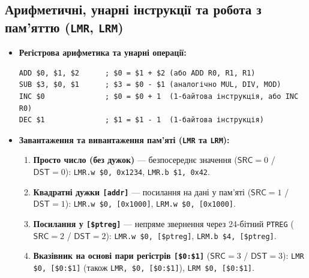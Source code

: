 \documentclass[11pt,a4paper]{article}
\newcommand{\reg}[1]{\texttt{#1}}
\newcommand{\field}[1]{\textsf{#1}}
\begin{document}
\subsection{Арифметичні, унарні інструкції та робота з пам'яттю (\texttt{LMR}, \texttt{LRM})}
\begin{itemize}
  \item \textbf{Регістрова арифметика та унарні операції:}
\begin{verbatim}
ADD $0, $1, $2      ; $0 = $1 + $2 (або ADD R0, R1, R1)
SUB $3, $0, $1      ; $3 = $0 - $1 (аналогічно MUL, DIV, MOD)
INC $0              ; $0 = $0 + 1  (1-байтова інструкція, або INC R0)
DEC $1              ; $1 = $1 - 1  (1-байтова інструкція)
\end{verbatim}
  \item \textbf{Завантаження та вивантаження пам'яті (\texttt{LMR} та \texttt{LRM}):}
    \begin{enumerate}
      \item \textbf{Просто число (без дужок)} --- безпосереднє значення ($\field{SRC}=0$ / $\field{DST}=0$): \texttt{LMR.w \$0, 0x1234}, \texttt{LMR.b \$1, 0x42}.
      \item \textbf{Квадратні дужки \texttt{[addr]}} --- посилання на дані у пам'яті ($\field{SRC}=1$ / $\field{DST}=1$): \texttt{LMR.w \$0, [0x1000]}, \texttt{LRM.w \$0, [0x1000]}.
      \item \textbf{Посилання у \texttt{[\$ptreg]}} --- непряме звернення через 24-бітний \reg{PTREG} ($\field{SRC}=2$ / $\field{DST}=2$): \texttt{LMR.w \$0, [\$ptreg]}, \texttt{LRM.b \$4, [\$ptreg]}.
      \item \textbf{Вказівник на основі пари регістрів \texttt{[\$0:\$1]}} ($\field{SRC}=3$ / $\field{DST}=3$): \texttt{LMR \$0, [\$0:\$1]} (також \texttt{LMR, \$0, [\$0:\$1]}), \texttt{LRM \$0, [\$0:\$1]}.
    \end{enumerate}
\end{itemize}
\end{document}
